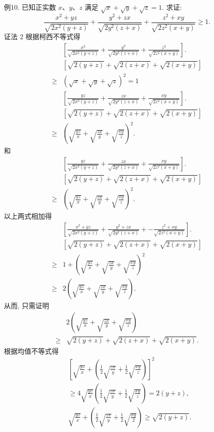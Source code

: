 例10. 已知正实数 $x 、 y 、 z$ 满足 $\sqrt{x}+\sqrt{y}+\sqrt{z}=1$. 求证:
$$
\frac{x^2+y z}{\sqrt{2 x^2(y+z)}}+\frac{y^2+z x}{\sqrt{2 y^2(z+x)}}+\frac{z^2+x y}{\sqrt{2 z^2(x+y)}} \geqslant 1 .
$$
证法 2 根据柯西不等式得
$$
\begin{aligned}
& {\left[\frac{x^2}{\sqrt{2 x^2(y+z)}}+\frac{y^2}{\sqrt{2 y^2(z+x)}}+\frac{z^2}{\sqrt{2 z^2(x+y)}}\right] . } \\
& {[\sqrt{2(y+z)}+\sqrt{2(z+x)}+\sqrt{2(x+y)}] } \\
\geqslant & (\sqrt{x}+\sqrt{y}+\sqrt{z})^2=1 \\
& {\left[\frac{y z}{\sqrt{2 x^2(y+z)}}+\frac{z x}{\sqrt{2 y^2(z+x)}}+\frac{x y}{\sqrt{2 z^2(x+y)}}\right] . } \\
& {[\sqrt{2(y+z)}+\sqrt{2(z+x)}+\sqrt{2(x+y)}] } \\
\geqslant & \left(\sqrt{\frac{y z}{x}}+\sqrt{\frac{z x}{y}}+\sqrt{\frac{x y}{z}}\right)^2 .
\end{aligned}
$$
和
$$
\begin{aligned}
& {\left[\frac{y z}{\sqrt{2 x^2(y+z)}}+\frac{z x}{\sqrt{2 y^2(z+x)}}+\frac{x y}{\sqrt{2 z^2(x+y)}}\right] . } \\
& {[\sqrt{2(y+z)}+\sqrt{2(z+x)}+\sqrt{2(x+y)}] } \\
\geqslant & \left(\sqrt{\frac{y z}{x}}+\sqrt{\frac{z x}{y}}+\sqrt{\frac{x y}{z}}\right)^2 .
\end{aligned}
$$
以上两式相加得
$$
\begin{aligned}
& {\left[\frac{x^2+y z}{\sqrt{2 x^2(y+z)}}+\frac{y^2+z x}{\sqrt{2 y^2(z+x)}}+-\frac{z^2+x y}{\sqrt{2 z^2(x+y)}}\right] . } \\
& {[\sqrt{2(y+z)}+\sqrt{2(z+x)}+\sqrt{2(x+y)}] } \\
\geqslant & 1+\left(\sqrt{\frac{y z}{x}}+\sqrt{\frac{z x}{y}}+\sqrt{\frac{x y}{z}}\right)^2 \\
\geqslant & 2\left(\sqrt{\frac{y z}{x}}+\sqrt{\frac{z x}{y}}+\sqrt{\frac{x y}{z}}\right) .
\end{aligned}
$$
从而, 只需证明
$$
\begin{aligned}
& 2\left(\sqrt{\frac{y z}{x}}+\sqrt{\frac{z x}{y}}+\sqrt{\frac{x y}{z}}\right) \\
\geqslant & \sqrt{2(y+z)}+\sqrt{2(z+x)}+\sqrt{2(x+y)} .
\end{aligned}
$$
根据均值不等式得
$$
\begin{aligned}
& {\left[\sqrt{\frac{y z}{x}}+\left(\frac{1}{2} \sqrt{\frac{z x}{y}}+\frac{1}{2} \sqrt{\frac{x y}{z}}\right)\right]^2 } \\
& \geqslant 4 \sqrt{\frac{y z}{x}}\left(\frac{1}{2} \sqrt{\frac{z x}{y}}+\frac{1}{2} \sqrt{\frac{x y}{z}}\right)=2(y+z), \\
& \sqrt{\frac{y z}{x}}+\left(\frac{1}{2} \sqrt{\frac{z x}{y}}+\frac{1}{2} \sqrt{\frac{x y}{2}}\right) \geqslant \sqrt{2(y+z)} .
\end{aligned}
$$
